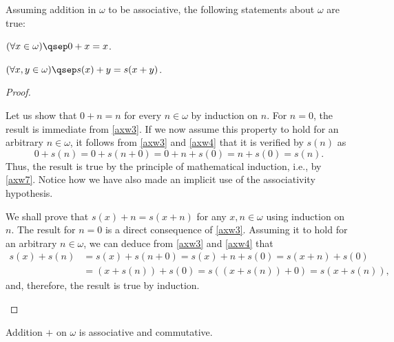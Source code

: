 \begin{lemma}
Assuming addition in $\omega$ to be associative, the following statements about $\omega$ are true:
\begin{statements}
\item \label{xp0i0} $(\forall x \in \omega)\qsep 0 + x = x$.
\item \label{switchs} $(\forall x,y\in \omega)\qsep s(x) + y = s(x+y)$.
\end{statements}
\label{lemmaomplus}
\end{lemma}

\begin{proof}
\begin{parlist}
\item Let us show that $0 + n = n$ for every $n\in \omega$ by induction on $n$.
For $n = 0$, the result is immediate from \ref{axw3}.
If we now assume this property to hold for an arbitrary $n\in \omega$, it follows from \ref{axw3} and \ref{axw4} that it is verified by $s(n)$ as
\[ 0 + s(n) = 0 + s(n+0) = 0 + n + s(0) = n + s(0) = s(n).\]
Thus, the result is true by the principle of mathematical induction, i.e., by \ref{axw7}.
Notice how we have also made an implicit use of the associativity hypothesis.

\item We shall prove that $s(x) + n = s(x+n)$ for any $x,n\in \omega$ using induction on $n$.
The result for $n = 0$ is a direct consequence of \ref{axw3}. Assuming it to hold for an arbitrary $n\in \omega$, we can deduce from \ref{axw3} and \ref{axw4} that
\begin{align*}
s(x) + s(n) &= s(x) + s(n+0) = s(x) + n + s(0) = s(x+n) + s(0) \\
&= (x+s(n)) + s(0) = s( (x+s(n)) + 0) = s(x+s(n)),
\end{align*}
and, therefore, the result is true by induction.
\end{parlist}
\end{proof}

\begin{proposition}
Addition $+$ on $\omega$ is associative and commutative.
\end{proposition}


